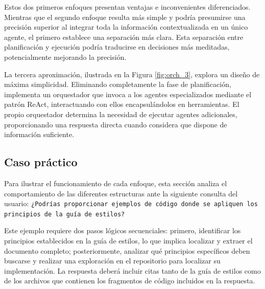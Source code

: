 Estos dos primeros enfoques presentan ventajas e inconvenientes diferenciados. Mientras que el segundo enfoque resulta más simple y podría presumirse una precisión superior al integrar toda la información contextualizada en un único agente, el primero establece una separación más clara. Esta separación entre planificación y ejecución podría traducirse en decisiones más meditadas, potencialmente mejorando la precisión.

La tercera aproximación, ilustrada en la Figura \ref{fig:orch_3}, explora un diseño de máxima simplicidad. Eliminando completamente la fase de planificación, implementa un orquestador que invoca a los agentes especializados mediante el patrón ReAct, interactuando con ellos encapsulándolos en herramientas. El propio orquestador determina la necesidad de ejecutar agentes adicionales, proporcionando una respuesta directa cuando considera que dispone de información suficiente.

\subsection{Caso práctico}
Para ilustrar el funcionamiento de cada enfoque, esta sección analiza el comportamiento de las diferentes estructuras ante la siguiente consulta del usuario: \texttt{¿Podrías proporcionar ejemplos de código donde se apliquen los principios de la guía de estilos?}

Este ejemplo requiere dos pasos lógicos secuenciales: primero, identificar los principios establecidos en la guía de estilos, lo que implica localizar y extraer el documento completo; posteriormente, analizar qué principios específicos deben buscarse y realizar una exploración en el repositorio para localizar su implementación. La respuesta deberá incluir citas tanto de la guía de estilos como de los archivos que contienen los fragmentos de código incluidos en la respuesta.

